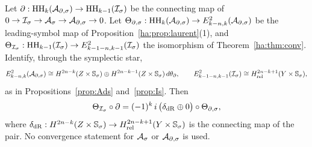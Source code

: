 \begin{theorem}
\label{ha:thm:bdry}
Let \(\partial:\operatorname{HH}_k(\mathcal A_{\partial,\sigma})\to\operatorname{HH}_{k-1}(\mathcal I_\sigma)\) be the connecting map of
\(0\to\mathcal I_\sigma\to\mathcal A_\sigma\to\mathcal A_{\partial,\sigma}\to0\). Let \(\Theta_{\partial,\sigma}:\operatorname{HH}_k(\mathcal A_{\partial,\sigma})\to
E^2_{k-n,k}(\mathcal A_{\partial,\sigma})\) be the leading-symbol map of
Proposition~\ref{ha:prop:laurent}(1), and \(\Theta_{\mathcal I_\sigma}:
\operatorname{HH}_{k-1}(\mathcal I_\sigma)\to E^2_{k-1-n,k-1}(\mathcal I_\sigma)\) the isomorphism of
Theorem~\ref{ha:thm:conv}. Identify, through the symplectic star,
\[
 E^2_{k-n,k}(\mathcal A_{\partial,\sigma})\cong H^{2n-k}(Z\times\mathbb S_\sigma)\oplus H^{2n-k-1}(Z\times\mathbb S_\sigma)
 \,d\theta_\partial,\qquad
 E^2_{k-1-n,k-1}(\mathcal I_\sigma)\cong H_{\mathrm{rel}}^{2n-k+1}(Y\times\mathbb S_\sigma),
\]
as in Propositions~\ref{prop:Ads} and~\ref{prop:Is}. Then
\[
 \Theta_{\mathcal I_\sigma}\circ\partial=(-1)^k\,i\,\bigl(\delta_{\mathrm{dR}}\oplus0
 \bigr)\circ\Theta_{\partial,\sigma},
\]
where \(\delta_{\mathrm{dR}}:H^{2n-k}(Z\times\mathbb S_\sigma)\to H_{\mathrm{rel}}^{2n-k+1}(Y
\times\mathbb S_\sigma)\) is the connecting map of the pair. No convergence
statement for \(\mathcal A_\sigma\) or \(\mathcal A_{\partial,\sigma}\) is used.
\end{theorem}

